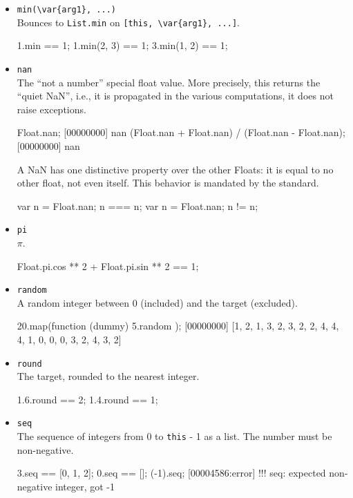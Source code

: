 \begin{itemize}
\item \lstinline|min(\var{arg1}, ...)|\\
  Bounces to \lstinline|List.min| on \lstinline|[this, \var{arg1}, ...]|.
\begin{urbiassert}[firstnumber=last]
1.min == 1;
1.min(2, 3) == 1;
3.min(1, 2) == 1;
\end{urbiassert}

\item \lstinline|nan|\\
  The ``not a number'' special float value.  More precisely, this
  returns the ``quiet NaN'', i.e., it is propagated in the various
  computations, it does not raise exceptions.
\begin{urbiscript}[firstnumber=last]
Float.nan;
[00000000] nan
(Float.nan + Float.nan) / (Float.nan - Float.nan);
[00000000] nan
\end{urbiscript}

A {NaN} has one distinctive property over the other Floats: it is
equal to no other float, not even itself.  This behavior is mandated
by the  standard.
\begin{urbiassert}[firstnumber=last]
{ var n = Float.nan; n === n};
{ var n = Float.nan; n  != n};
\end{urbiassert}

\item \lstinline|pi|\\
  $\pi$.
\begin{urbiassert}[firstnumber=last]
Float.pi.cos ** 2 + Float.pi.sin ** 2 == 1;
\end{urbiassert}

\item \lstinline|random|\\
  A random integer between 0 (included) and the target (excluded).
\begin{urbiscript}[firstnumber=last]
20.map(function (dummy) { 5.random });
[00000000] [1, 2, 1, 3, 2, 3, 2, 2, 4, 4, 4, 1, 0, 0, 0, 3, 2, 4, 3, 2]
\end{urbiscript}

\item \lstinline|round|\\
  The target, rounded to the nearest integer.
\begin{urbiassert}[firstnumber=last]
1.6.round == 2;
1.4.round == 1;
\end{urbiassert}

\item \lstinline|seq|\\
  The sequence of integers from 0 to \lstinline|this| - 1 as a list.
  The number must be non-negative.
\begin{urbiassert}[firstnumber=last]
3.seq == [0, 1, 2];
0.seq == [];
(-1).seq;
[00004586:error] !!! seq: expected non-negative integer, got -1
\end{urbiassert}


\end{itemize}
